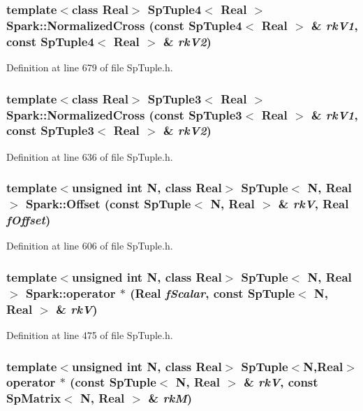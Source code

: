 \subsubsection{\setlength{\rightskip}{0pt plus 5cm}template$<$class Real$>$ {\bf Sp\-Tuple4}$<$ Real $>$ Spark::Normalized\-Cross (const Sp\-Tuple4$<$ Real $>$ \& {\em rk\-V1}, const Sp\-Tuple4$<$ Real $>$ \& {\em rk\-V2})}\label{namespaceSpark_a129}


Definition at line 679 of file Sp\-Tuple.h.
\subsubsection{\setlength{\rightskip}{0pt plus 5cm}template$<$class Real$>$ {\bf Sp\-Tuple3}$<$ Real $>$ Spark::Normalized\-Cross (const Sp\-Tuple3$<$ Real $>$ \& {\em rk\-V1}, const Sp\-Tuple3$<$ Real $>$ \& {\em rk\-V2})}\label{namespaceSpark_a126}


Definition at line 636 of file Sp\-Tuple.h.
\subsubsection{\setlength{\rightskip}{0pt plus 5cm}template$<$unsigned int N, class Real$>$ {\bf Sp\-Tuple}$<$ N, Real $>$ Spark::Offset (const Sp\-Tuple$<$ N, Real $>$ \& {\em rk\-V}, Real {\em f\-Offset})}\label{namespaceSpark_a124}


Definition at line 606 of file Sp\-Tuple.h.
\subsubsection{\setlength{\rightskip}{0pt plus 5cm}template$<$unsigned int N, class Real$>$ {\bf Sp\-Tuple}$<$ N, Real $>$ Spark::operator $\ast$ (Real {\em f\-Scalar}, const Sp\-Tuple$<$ N, Real $>$ \& {\em rk\-V})}\label{namespaceSpark_a118}


Definition at line 475 of file Sp\-Tuple.h.
\subsubsection{\setlength{\rightskip}{0pt plus 5cm}template$<$unsigned int N, class Real$>$ {\bf Sp\-Tuple}$<$N,Real$>$ operator $\ast$ (const Sp\-Tuple$<$ N, Real $>$ \& {\em rk\-V}, const Sp\-Matrix$<$ N, Real $>$ \& {\em rk\-M})}\label{namespaceSpark_a70}



